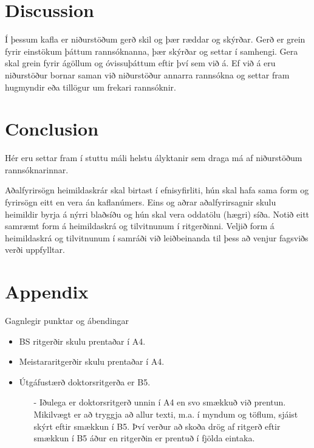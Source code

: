 \documentclass[a4paper, 12pt, twoside]{scrreprt}
\begin{document}
\chapter{Discussion}
Í þessum kafla er niðurstöðum gerð skil og þær ræddar og skýrðar. Gerð er grein fyrir einstökum þáttum rannsóknanna, þær skýrðar og settar í samhengi. Gera skal grein fyrir ágöllum og óvissuþáttum eftir því sem við á. Ef við á eru niðurstöður bornar saman við niðurstöður annarra rannsókna og settar fram hugmyndir eða tillögur um frekari rannsóknir.

\chapter{Conclusion}
Hér eru settar fram í stuttu máli helstu ályktanir sem draga má af niðurstöðum rannsóknarinnar.


%
%
\printbibliography[heading=bibintoc] %

Aðalfyrirsögn heimildaskrár skal birtast í efnisyfirliti, hún skal hafa sama form og fyrirsögn eitt en vera án kaflanúmers. Eins og aðrar aðalfyrirsagnir skulu heimildir byrja á nýrri blaðsíðu og hún skal vera oddatölu (hægri) síða.
Notið eitt samræmt form á heimildaskrá og tilvitnunum í ritgerðinni. Veljið form á heimildaskrá og tilvitnunum í samráði við leiðbeinanda til þess að venjur fagsviðs verði uppfylltar.


% 
% 
\appendix
\renewcommand{\chaptername}{Appendix}
\chapter{Appendix}
Gagnlegir punktar og ábendingar
\begin{itemize}
 \item BS ritgerðir skulu prentaðar í A4.
 \item Meistararitgerðir skulu prentaðar í A4.
 \item Útgáfustærð doktorsritgerða er B5.
\begin{itemize}
 \item[-] Iðulega er doktorsritgerð unnin í A4 en svo smækkuð við prentun. Mikilvægt er að tryggja að allur texti, m.a. í myndum og töflum, sjáist skýrt eftir smækkun í B5. Því verður að skoða drög af ritgerð eftir smækkun í B5 áður en ritgerðin er prentuð í fjölda eintaka.
\end{itemize}

\end{itemize}
\end{document}
